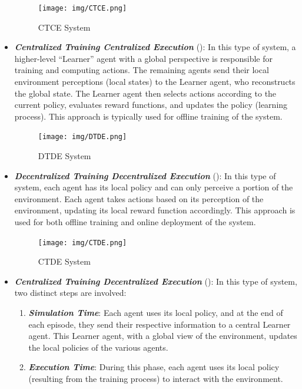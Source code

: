 \documentclass[12pt,a4paper,openright,twoside]{book}
\begin{document}
\begin{itemize}
    \begin{figure}
    \centering
    \texttt{[image: img/CTCE.png]}
    \caption{CTCE System \cite{aguzzi}}
    \label{fig:a}
    \end{figure}

    \item \textbf{\textit{Centralized Training Centralized Execution}} (): In this type of system, a higher-level ``Learner'' agent with a global perspective is responsible for training and computing actions. The remaining agents send their local environment perceptions (local states) to the Learner agent, who reconstructs the global state. The Learner agent then selects actions according to the current policy, evaluates reward functions, and updates the policy (learning process). This approach is typically used for offline training of the system.
    
    \begin{figure}
    \centering
    \texttt{[image: img/DTDE.png]}
    \caption{DTDE System \cite{aguzzi}}
    \label{fig:b}
    \end{figure}

    \item \textbf{\textit{Decentralized Training Decentralized Execution}} (): In this type of system, each agent has its local policy and can only perceive a portion of the environment. Each agent takes actions based on its perception of the environment, updating its local reward function accordingly. This approach is used for both offline training and online deployment of the system.
    
    \begin{figure}
      \centering
      \texttt{[image: img/CTDE.png]}
      \caption{CTDE System \cite{aguzzi}}
      \label{fig:c}
      \end{figure}
    
    \item \textbf{\textit{Centralized Training Decentralized Execution}} (): In this type of system, two distinct steps are involved:
    \begin{enumerate}
        \item \textbf{\textit{Simulation Time}}: Each agent uses its local policy, and at the end of each episode, they send their respective information to a central Learner agent. This Learner agent, with a global view of the environment, updates the local policies of the various agents.
        \item \textbf{\textit{Execution Time}}: During this phase, each agent uses its local policy (resulting from the training process) to interact with the environment.
    \end{enumerate}
    
\end{itemize}
\end{document}
